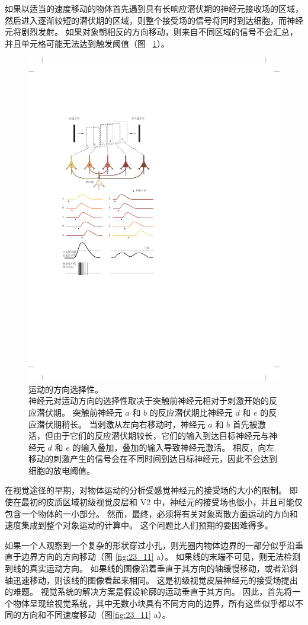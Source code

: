 如果以适当的速度移动的物体首先遇到具有长响应潜伏期的神经元接收场的区域，然后进入逐渐较短的潜伏期的区域，则整个接受场的信号将同时到达细胞，而神经元将剧烈发射。
如果对象朝相反的方向移动，则来自不同区域的信号不会汇总，并且单元格可能无法达到触发阈值（图 ~\ref{fig:23_10}）。


\begin{figure}[htbp]
	\centering
	\includegraphics[width=0.5\linewidth]{chap23/fig_23_10}
	\caption{运动的方向选择性。 \protect\\
		神经元对运动方向的选择性取决于突触前神经元相对于刺激开始的反应潜伏期。
		突触前神经元 $a$ 和 $b$ 的反应潜伏期比神经元 $d$ 和 $e$ 的反应潜伏期稍长。
		当刺激从左向右移动时，神经元 $a$ 和 $b$ 首先被激活，但由于它们的反应潜伏期较长，它们的输入到达目标神经元与神经元 $d$ 和 $e$ 的输入叠加，叠加的输入导致神经元激活。
		相反，向左移动的刺激产生的信号会在不同时间到达目标神经元，因此不会达到细胞的放电阈值\cite{priebe2008inhibition}。}
	\label{fig:23_10}
\end{figure}


在视觉途径的早期，对物体运动的分析受感觉神经元的接受场的大小的限制。 
即使在最初的皮质区域初级视觉皮层和 V2 中，神经元的接受场也很小，并且可能仅包含一个物体的一小部分。 
然而，最终，必须将有关对象离散方面运动的方向和速度集成到整个对象运动的计算中。 
这个问题比人们预期的要困难得多。


如果一个人观察到一个复杂的形状穿过小孔，则光圈内物体边界的一部分似乎沿垂直于边界方向的方向移动（图 \ref{fig:23_11} a）。 
如果线的末端不可见，则无法检测到线的真实运动方向。 
如果线的图像沿着垂直于其方向的轴缓慢移动，或者沿斜轴迅速移动，则该线的图像看起来相同。
这是初级视觉皮层神经元的接受场提出的难题。 
视觉系统的解决方案是假设轮廓的运动垂直于其方向。 
因此，首先将一个物体呈现给视觉系统，其中无数小块具有不同方向的边界，所有这些似乎都以不同的方向和不同速度移动（图\ref{fig:23_11} a）。

